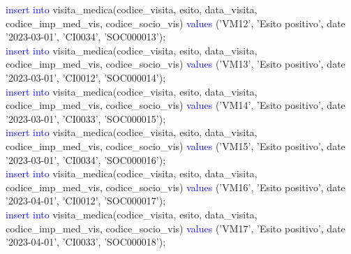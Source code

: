 \documentclass{article}
\begin{document}
\begin{flushleft}
{        \vspace{2mm}
        \hspace*{0.5em}\textcolor{blue}{insert into} visita\_medica(codice\_visita, esito, data\_visita, codice\_imp\_med\_vis, \hspace*{0.5em}codice\_socio\_vis) \textcolor{blue}{values} ('VM12', 'Esito positivo', date '2023-03-01', 'CI0034', \hspace*{0.5em}'SOC000013'); \\
        \newpage
        \hspace*{0.5em}\textcolor{blue}{insert into} visita\_medica(codice\_visita, esito, data\_visita, codice\_imp\_med\_vis, \hspace*{0.5em}codice\_socio\_vis) \textcolor{blue}{values} ('VM13', 'Esito positivo', date '2023-03-01', 'CI0012', \hspace*{0.5em}'SOC000014'); \\
        \vspace{2mm}
        \hspace*{0.5em}\textcolor{blue}{insert into} visita\_medica(codice\_visita, esito, data\_visita, codice\_imp\_med\_vis, \hspace*{0.5em}codice\_socio\_vis) \textcolor{blue}{values} ('VM14', 'Esito positivo', date '2023-03-01', 'CI0033', \hspace*{0.5em}'SOC000015'); \\
        \vspace{2mm}
        \hspace*{0.5em}\textcolor{blue}{insert into} visita\_medica(codice\_visita, esito, data\_visita, codice\_imp\_med\_vis, \hspace*{0.5em}codice\_socio\_vis) \textcolor{blue}{values} ('VM15', 'Esito positivo', date '2023-03-01', 'CI0034', \hspace*{0.5em}'SOC000016'); \\
        \vspace{2mm}
        \hspace*{0.5em}\textcolor{blue}{insert into} visita\_medica(codice\_visita, esito, data\_visita, codice\_imp\_med\_vis, \hspace*{0.5em}codice\_socio\_vis) \textcolor{blue}{values} ('VM16', 'Esito positivo', date '2023-04-01', 'CI0012', \hspace*{0.5em}'SOC000017'); \\
        \vspace{2mm}
        \hspace*{0.5em}\textcolor{blue}{insert into} visita\_medica(codice\_visita, esito, data\_visita, codice\_imp\_med\_vis, \hspace*{0.5em}codice\_socio\_vis) \textcolor{blue}{values} ('VM17', 'Esito positivo', date '2023-04-01', 'CI0033', \hspace*{0.5em}'SOC000018'); \\
}
\end{flushleft}
\end{document}

